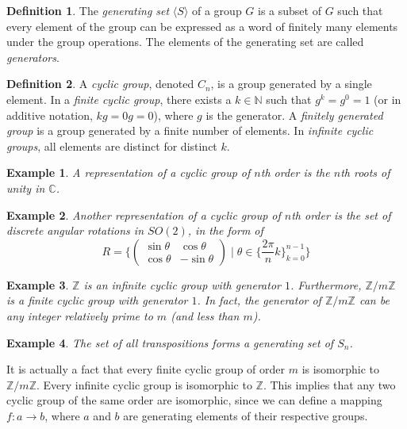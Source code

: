 \documentclass{article}
\newtheorem{example}{Example}[section]
\theoremstyle{remark}
\theoremstyle{definition}
\newtheorem{definition}{Definition}[section]
\begin{document}
\begin{definition}
The \textit{generating set} $\langle S \rangle$ of a group $G$ is a subset of $G$ such that every element of the group can be expressed as a word of finitely many elements under the group operations. The elements of the generating set are called \textit{generators}.
\end{definition}

\begin{definition}
A \textit{cyclic group}, denoted $C_{n}$, is a group generated by a single element. In a \textit{finite cyclic group}, there exists a $k \in \mathbb{N}$ such that $g^{k} = g^{0} = 1$ (or in additive notation, $kg = 0g = 0$), where $g$ is the generator. A \textit{finitely generated group} is a group generated by a finite number of elements. In \textit{infinite cyclic groups}, all elements are distinct for distinct $k$. 
\end{definition}

\begin{example}
A representation of a cyclic group of $n$th order is the $n$th roots of unity in $\mathbb{C}$.
\end{example}

\begin{example}
Another representation of a cyclic group of $n$th order is the set of discrete angular rotations in $SO(2)$, in the form of 
\[ R =  \bigg\{ \begin{pmatrix}
\sin{\theta} & \cos{\theta} \\
\cos{\theta} & -\sin{\theta}
\end{pmatrix}\; \bigg| \; \theta \in \Big\{\frac{2 \pi}{n} k\Big\}_{k = 0}^{n-1} \bigg\} \]
\end{example}

\begin{example}
$\mathbb{Z}$ is an infinite cyclic group with generator $1$. Furthermore, $\mathbb{Z}/m\mathbb{Z}$ is a finite cyclic group with generator $1$. In fact, the generator of $\mathbb{Z}/m\mathbb{Z}$ can be any integer relatively prime to $m$ (and less than $m$). 
\end{example}

\begin{example}
The set of all \textit{transpositions} forms a generating set of $S_{n}$. 
\end{example}

It is actually a fact that every finite cyclic group of order $m$ is isomorphic to $\mathbb{Z}/m\mathbb{Z}$. Every infinite cyclic group is isomorphic to $\mathbb{Z}$. This implies that any two cyclic group of the same order are isomorphic, since we can define a mapping $f:a\longrightarrow b$, where $a$ and $b$ are generating elements of their respective groups. 
\end{document}
